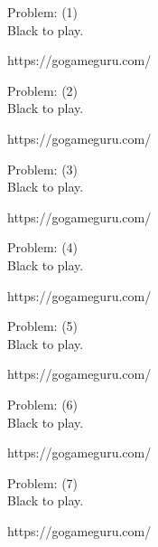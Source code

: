 \documentclass[11pt]{article}
\begin{document}
\begin{minipage}[t]{0.5\textwidth}
  {\centering
  
  Problem: (1)\\
  Black to play.

https://gogameguru.com/\\
  }
\end{minipage}
\begin{minipage}[t]{0.5\textwidth}
  {\centering
  
  Problem: (2)\\
  Black to play.

https://gogameguru.com/\\
  }
\end{minipage}
\begin{minipage}[t]{0.5\textwidth}
  {\centering
  
  Problem: (3)\\
  Black to play.

https://gogameguru.com/\\
  }
\end{minipage}
\begin{minipage}[t]{0.5\textwidth}
  {\centering
  
  Problem: (4)\\
  Black to play.

https://gogameguru.com/\\
  }
\end{minipage}
\begin{minipage}[t]{0.5\textwidth}
  {\centering
  
  Problem: (5)\\
  Black to play.

https://gogameguru.com/\\
  }
\end{minipage}
\begin{minipage}[t]{0.5\textwidth}
  {\centering
  
  Problem: (6)\\
  Black to play.

https://gogameguru.com/\\
  }
\end{minipage}
\begin{minipage}[t]{0.5\textwidth}
  {\centering
  
  Problem: (7)\\
  Black to play.

https://gogameguru.com/\\
  }
\end{minipage}
\end{document}
